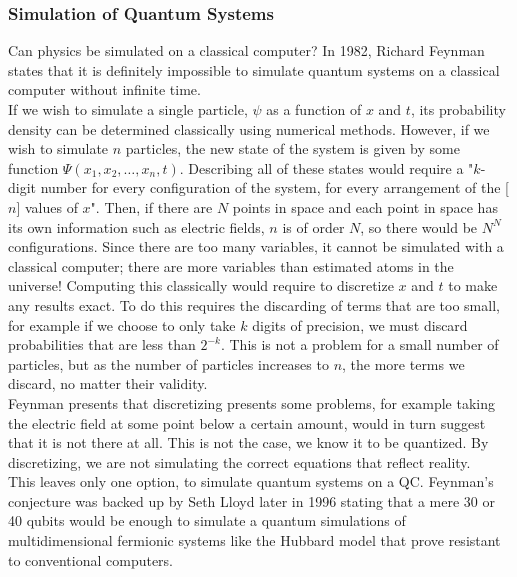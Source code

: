 \documentclass[reqno]{amsart}
\numberwithin{equation}{section}
\numberwithin{figure}{section}
\begin{document}
\subsubsection{Simulation of Quantum Systems}
\begin{justify}
Can physics be simulated on a classical computer? In 1982, Richard Feynman states that it is definitely impossible to simulate quantum systems on a classical computer without infinite time. \cite{Feynman1982} \\

If we wish to simulate a single particle, $\psi$ as a function of $x$ and $t$, its probability density can be determined classically using numerical methods. \cite{Schroedinger1926} However, if we wish to simulate $n$ particles, the new state of the system is given by some function $\Psi(x_{1}, x_{2}, \ldots, x_{n}, t)$. Describing all of these states would require a "$k$-digit number for every configuration of the system, for every arrangement of the [$n$] values of $x$". Then, if there are $N$ points in space and each point in space has its own information such as electric fields, $n$ is of order $N$, so there would be $N^N$ configurations. Since there are too many variables, it cannot be simulated with a classical computer; there are more variables than estimated atoms in the universe! Computing this classically would require to discretize $x$ and $t$ to make any results exact. To do this requires the discarding of terms that are too small, for example if we choose to only take $k$ digits of precision, we must discard probabilities that are less than $2^{-k}$. This is not a problem for a small number of particles, but as the number of particles increases to $n$, the more terms we discard, no matter their validity. \\

Feynman presents that discretizing presents some problems, for example taking the electric field at some point below a certain amount, would in turn suggest that it is not there at all. This is not the case, we know it to be quantized. By discretizing, we are not simulating the correct equations that reflect reality. \\

This leaves only one option, to simulate quantum systems on a QC. Feynman's conjecture was backed up by Seth Lloyd later in 1996 \cite{Lloyd1996} stating that a mere 30 or 40 qubits would be enough to simulate a quantum simulations of multidimensional fermionic systems like the Hubbard model \cite{Hubbard1963} that prove resistant to conventional computers. \\
\end{justify}
\end{document}
